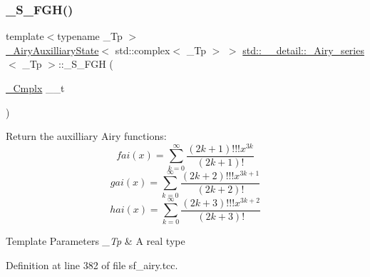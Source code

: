 \mbox{\label{classstd_1_1____detail_1_1__Airy__series_ae3b42646089ac6a58bb4e4be18d784ec}} 
\subsubsection{\texorpdfstring{\+\_\+\+S\+\_\+\+F\+G\+H()}{\_S\_FGH()}}
{\footnotesize\ttfamily template$<$typename \+\_\+\+Tp $>$ \\
\hyperlink{structstd_1_1____detail_1_1__AiryAuxilliaryState}{\+\_\+\+Airy\+Auxilliary\+State}$<$ std\+::complex$<$ \+\_\+\+Tp $>$ $>$ \hyperlink{classstd_1_1____detail_1_1__Airy__series}{std\+::\+\_\+\+\_\+detail\+::\+\_\+\+Airy\+\_\+series}$<$ \+\_\+\+Tp $>$\+::\+\_\+\+S\+\_\+\+F\+GH (\begin{DoxyParamCaption}\item[{\hyperlink{classstd_1_1____detail_1_1__Airy__series_ab41161caa54609f4735987fbaed41d9d}{\+\_\+\+Cmplx}}]{\+\_\+\+\_\+t }\end{DoxyParamCaption})\hspace{0.3cm}{\ttfamily [static]}}

Return the auxilliary Airy functions\+: \[ fai(x) = \sum_{k=0}^\infty \frac{(2k+1)!!!x^{3k}}{(2k+1)!} \] \[ gai(x) = \sum_{k=0}^\infty \frac{(2k+2)!!!x^{3k+1}}{(2k+2)!} \] \[ hai(x) = \sum_{k=0}^\infty \frac{(2k+3)!!!x^{3k+2}}{(2k+3)!} \]


\begin{DoxyTemplParams}{Template Parameters}
{\em \+\_\+\+Tp} & A real type \\
\hline
\end{DoxyTemplParams}


Definition at line 382 of file sf\+\_\+airy.\+tcc.

\mbox{\label{classstd_1_1____detail_1_1__Airy__series_a70314b5de10d149481db61d30ded43d5}} 
